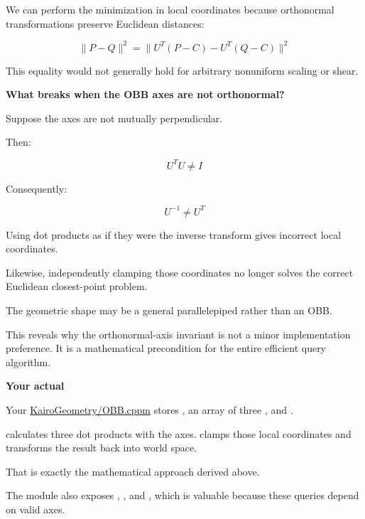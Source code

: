 We can perform the minimization in local coordinates because orthonormal transformations preserve Euclidean distances:

\[
\|P-Q\|^2= \|U^T(P-C)-U^T(Q-C)\|^2
\]

This equality would not generally hold for arbitrary nonuniform scaling or shear.

\textbf{What breaks when the OBB axes are not orthonormal?}

Suppose the axes are not mutually perpendicular.

Then:

\[
U^TU\ne I
\]

Consequently:

\[
U^{-1}\ne U^T
\]

Using dot products as if they were the inverse transform gives incorrect local coordinates.

Likewise, independently clamping those coordinates no longer solves the correct Euclidean closest-point problem.

The geometric shape may be a general parallelepiped rather than an OBB.

This reveals why the orthonormal-axis invariant is not a minor implementation preference. It is a mathematical precondition for the entire efficient query algorithm.

\textbf{Your actual }

Your \href{https://github.com/swayam8624/KairoGeometry/blob/master/OBB.cppm?utm_source=chatgpt.com}{KairoGeometry/OBB.cppm} stores , an array of three , and .

 calculates three dot products with the axes.  clamps those local coordinates and transforms the result back into world space.

That is exactly the mathematical approach derived above.

The module also exposes , , and , which is valuable because these queries depend on valid axes.

